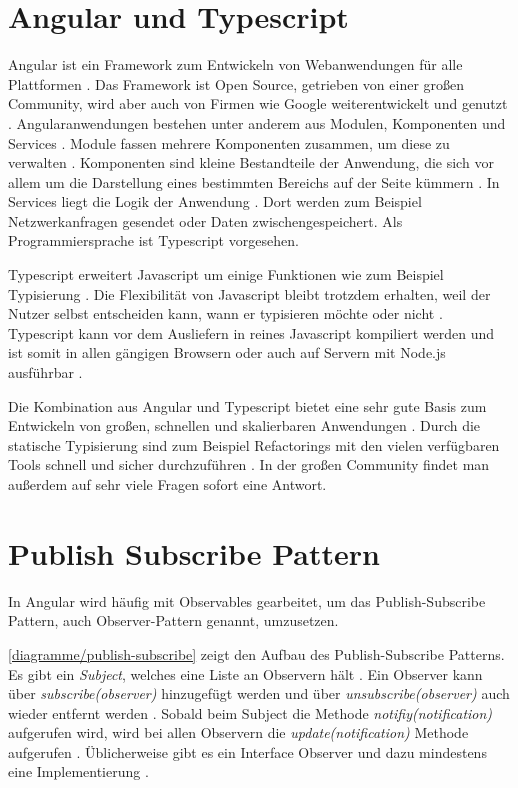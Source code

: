 \section{Angular und Typescript}
Angular ist ein Framework zum Entwickeln von Webanwendungen für alle Plattformen \autocite{angular-io}. Das Framework ist Open Source, getrieben von einer großen Community, wird aber auch von Firmen wie Google weiterentwickelt und genutzt \autocite{angular-io}. Angularanwendungen bestehen unter anderem aus Modulen, Komponenten und Services \autocite{angular-start}. Module fassen mehrere Komponenten zusammen, um diese zu verwalten \autocite{angular-start}. Komponenten sind kleine Bestandteile der Anwendung, die sich vor allem um die Darstellung eines bestimmten Bereichs auf der Seite kümmern \autocite{angular-start}. In Services liegt die Logik der Anwendung \autocite{angular-start}. Dort werden zum Beispiel Netzwerkanfragen gesendet oder Daten zwischengespeichert. Als Programmiersprache ist Typescript vorgesehen. 

Typescript erweitert Javascript um einige Funktionen wie zum Beispiel Typisierung \autocite{typescript-org}. Die Flexibilität von Javascript bleibt trotzdem erhalten, weil der Nutzer selbst entscheiden kann, wann er typisieren möchte oder nicht \autocite{typescript-org}. Typescript kann vor dem Ausliefern in reines Javascript kompiliert werden und ist somit in allen gängigen Browsern oder auch auf Servern mit Node.js ausführbar \autocite{typescript-org}.

Die Kombination aus Angular und Typescript bietet eine sehr gute Basis zum Entwickeln von großen, schnellen und skalierbaren Anwendungen \autocite{angular-io}. Durch die statische Typisierung sind zum Beispiel Refactorings mit den vielen verfügbaren Tools schnell und sicher durchzuführen \autocite{typescript-org} \autocite{angular-io}. In der großen Community findet man außerdem auf sehr viele Fragen sofort eine Antwort.

\section{Publish Subscribe Pattern}
In Angular wird häufig mit Observables gearbeitet, um das Publish-Subscribe Pattern, auch Observer-Pattern genannt, umzusetzen. 


\autoref{diagramme/publish-subscribe} zeigt den Aufbau des Publish-Subscribe Patterns. Es gibt ein \textit{Subject}, welches eine Liste an Observern hält \autocite{Mezzalira2018}. Ein Observer kann über \textit{subscribe(observer)} hinzugefügt werden und über \textit{unsubscribe(observer)} auch wieder entfernt werden \autocite{Mezzalira2018}. Sobald beim Subject die Methode \textit{notifiy(notification)} aufgerufen wird, wird bei allen Observern die \textit{update(notification)} Methode aufgerufen \autocite{Mezzalira2018}. Üblicherweise gibt es ein Interface Observer und dazu mindestens eine Implementierung \autocite{Mezzalira2018}.

